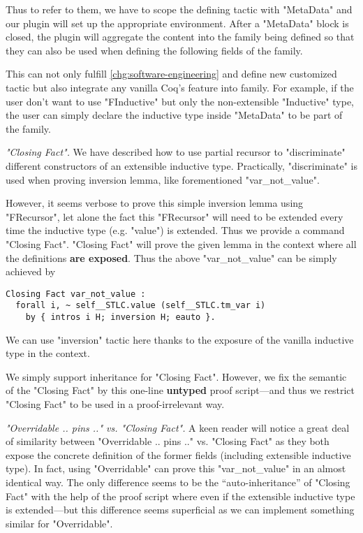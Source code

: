 Thus to refer to them, we have to scope the defining tactic with
"MetaData" and our plugin will set up the appropriate environment. After
a "MetaData" block is closed, the plugin will aggregate the content into
the family being defined so that they can also be used when defining
the following fields of the family.


This can not only fulfill \ref{chg:software-engineering} and define new customized tactic but also integrate any vanilla Coq's feature into family. For example, if the user don't want to use "FInductive" but only the non-extensible "Inductive" type, the user can simply declare the inductive type inside "MetaData" to be part of the family.


\textit{"Closing Fact".} We have described how to use partial recursor to "discriminate" different constructors of an extensible inductive type. Practically, "discriminate" is used when proving inversion lemma, like forementioned "var_not_value". 

However, it seems verbose to prove this simple inversion lemma using "FRecursor", let alone the fact this "FRecursor" will need to be extended every time the inductive type (e.g. "value") is extended. Thus we provide a command "Closing Fact". "Closing Fact" will prove the given lemma in the context where all the definitions \textbf{are exposed}. Thus the above "var_not_value" can be simply achieved by 
\begin{verbatim}
Closing Fact var_not_value : 
  forall i, ~ self__STLC.value (self__STLC.tm_var i) 
    by { intros i H; inversion H; eauto }.
\end{verbatim}
We can use "inversion" tactic here thanks to the exposure of the vanilla inductive type in the context. 

We simply support inheritance for "Closing Fact". However, we fix the semantic of the "Closing Fact" by this one-line \textbf{untyped} proof script---and thus we restrict "Closing Fact" to be used in a proof-irrelevant way.

\textit{"Overridable .. pins {..}" vs. "Closing Fact".} A keen reader will notice a great deal of similarity between "Overridable .. pins {..}" vs. "Closing Fact" as they both expose the concrete definition of the former fields (including extensible inductive type). In fact, using "Overridable" can prove this "var_not_value" in an almost identical way. The only difference seems to be the ``auto-inheritance'' of "Closing Fact" with the help of the proof script where even if the extensible inductive type is extended---but this difference seems superficial as we can implement something similar for "Overridable".

